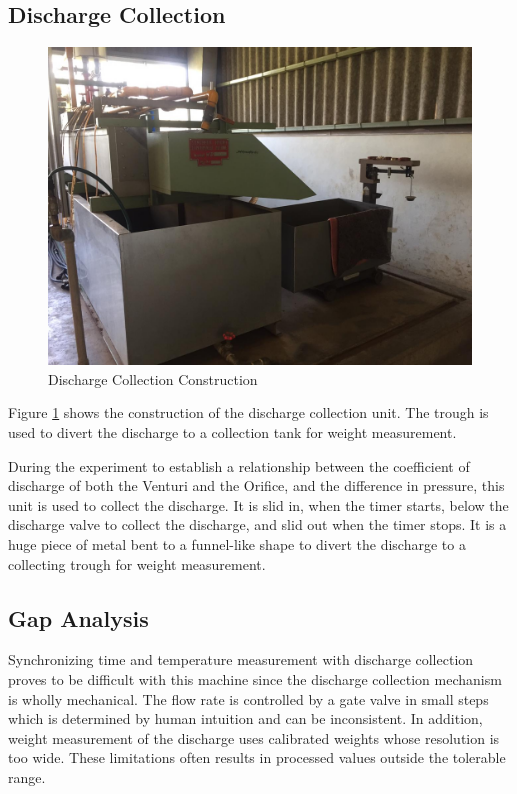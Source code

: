 \subsection{Discharge Collection}

\begin{figure}[ht]
\includegraphics[width=0.9\linewidth]{Figures/discharge.jpeg}
\centering
\caption{Discharge Collection Construction}
\label{fig:Discharge_Collection_Construction}
\end{figure}

Figure \ref{fig:Discharge_Collection_Construction} shows the construction of the discharge collection unit. The trough is used to divert the discharge to a collection tank for weight measurement.

\par

During the experiment to establish a relationship between the coefficient of discharge of both the Venturi and the Orifice, and the difference in pressure, this unit is used to collect the discharge. It is slid in, when the timer starts, below the discharge valve to collect the discharge, and slid out when the timer stops. It is a huge piece of metal bent to a funnel-like shape to divert the discharge to a collecting trough for weight measurement.

\subsection{Gap Analysis}
Synchronizing time and temperature measurement with discharge collection proves to be difficult with this machine since the discharge collection mechanism is wholly mechanical. The flow rate is controlled by a gate valve in small steps which is determined by human intuition and can be inconsistent. In addition, weight measurement of the discharge uses calibrated weights whose resolution is too wide. These limitations often results in processed values outside the tolerable range.  


